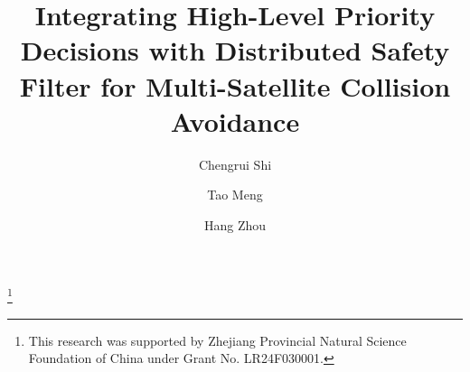 \documentclass{ifacconf}
\begin{document}
\begin{frontmatter}

\title{Integrating High-Level Priority Decisions with Distributed Safety Filter for Multi-Satellite Collision Avoidance} 

\thanks[footnoteinfo]{This research was supported by Zhejiang Provincial Natural Science Foundation of China under Grant No. LR24F030001.}

\author[First]{Chengrui Shi} 
\author[Second]{Tao Meng} 
\author[First]{Hang Zhou}

\address[First]{School of Aeronautics and Astronautics,  
Zhejiang University, Hangzhou, 310027, China (e-mail: chengruishi,hangzhou@zju.edu.cn).}
\address[Second]{Huanjiang Laboratory, 
   Zhuji, 311899, China (e-mail: mengtao@zju.edu.cn)}

\begin{abstract}                %


\end{abstract}
\end{frontmatter}
\end{document}
